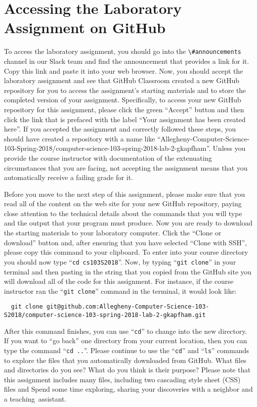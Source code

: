 \documentclass[11pt]{article}
\newcommand{\command}[1]{``\lstinline{#1}''}
\newcommand{\channel}[1]{\lstinline{#1}}
\newcommand{\step}[1]{``{#1}''}
\begin{document}
\section*{Accessing the Laboratory Assignment on GitHub}

To access the laboratory assignment, you should go into the
\channel{\#announcements} channel in our Slack team and find the announcement
that provides a link for it. Copy this link and paste it into your web browser.
Now, you should accept the laboratory assignment and see that GitHub Classroom
created a new GitHub repository for you to access the assignment's starting
materials and to store the completed version of your assignment. Specifically,
to access your new GitHub repository for this assignment, please click the green
``Accept'' button and then click the link that is prefaced with the label ``Your
assignment has been created here''. If you accepted the assignment and correctly
followed these steps, you should have created a repository with a name like
``Allegheny-Computer-Science-103-Spring-2018/computer-science-103-spring-2018-lab-2-gkapfham''.
Unless you provide the course instructor with documentation of the extenuating
circumstances that you are facing, not accepting the assignment means that you
automatically receive a failing grade for it.

Before you move to the next step of this assignment, please make sure that you
read all of the content on the web site for your new GitHub repository, paying
close attention to the technical details about the commands that you will type
and the output that your program must produce. Now you are ready to download the
starting materials to your laboratory computer. Click the ``Clone or download''
button and, after ensuring that you have selected ``Clone with SSH'', please
copy this command to your clipboard. To enter into your course directory you
should now type \command{cd cs103S2018}. Now, by typing \command{git clone} in
your terminal and then pasting in the string that you copied from the GitHub
site you will download all of the code for this assignment. For instance, if the
course instructor ran the \command{git clone} command in the terminal, it would
look like:

\begin{lstlisting}
  git clone git@github.com:Allegheny-Computer-Science-103-S2018/computer-science-103-spring-2018-lab-2-gkapfham.git
\end{lstlisting}

After this command finishes, you can use \command{cd} to change into the new
directory. If you want to \step{go back} one directory from your current
location, then you can type the command \command{cd ..}. Please continue to use
the \command{cd} and \command{ls} commands to explore the files that you
automatically downloaded from GitHub. What files and directories do you see?
What do you think is their purpose? Please note that this
assignment includes many files, including two cascading style sheet (CSS) files
and Spend some time exploring, sharing your
discoveries with a neighbor and a \mbox{teaching assistant}.
\end{document}
